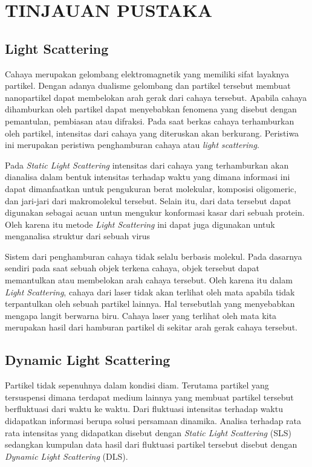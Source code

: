 \chapter{TINJAUAN PUSTAKA}

\section{Light Scattering}
Cahaya merupakan gelombang elektromagnetik yang memiliki sifat layaknya partikel. Dengan adanya
dualisme gelombang dan partikel tersebut membuat nanopartikel dapat membelokan arah gerak dari
cahaya tersebut. Apabila cahaya dihamburkan oleh partikel dapat menyebabkan fenomena yang disebut
dengan pemantulan, pembiasan atau difraksi. Pada saat berkas cahaya terhamburkan oleh partikel,
intensitas dari cahaya yang diteruskan akan berkurang. Peristiwa ini merupakan peristiwa penghamburan
cahaya atau \textit{light scattering}\cite{Black1996}.

Pada \textit{Static Light Scattering} intensitas dari cahaya yang terhamburkan  akan dianalisa dalam
bentuk intensitas terhadap waktu yang dimana informasi ini dapat dimanfaatkan untuk pengukuran berat
molekular, komposisi oligomeric, dan jari-jari dari makromolekul tersebut. Selain itu, dari data
tersebut dapat digunakan sebagai acuan untun mengukur konformasi kasar dari sebuah protein. Oleh
karena itu metode \textit{Light Scattering} ini dapat juga digunakan untuk menganalisa struktur dari
sebuah virus\cite{Stetefeld2016}

Sistem dari penghamburan cahaya tidak selalu berbasis molekul. Pada dasarnya sendiri pada saat
sebuah objek terkena cahaya, objek tersebut dapat memantulkan atau membelokan arah cahaya tersebut.
Oleh karena itu dalam \textit{Light Scattering}, cahaya dari laser tidak akan terlihat oleh mata
apabila tidak terpantulkan oleh sebuah partikel lainnya. Hal tersebutlah yang menyebabkan mengapa
langit berwarna biru. Cahaya laser yang terlihat oleh mata kita merupakan hasil dari hamburan
partikel di sekitar arah gerak cahaya tersebut.

\section{Dynamic Light Scattering}
Partikel tidak sepenuhnya dalam kondisi diam. Terutama partikel yang tersuspensi dimana terdapat
medium lainnya yang membuat partikel tersebut berfluktuasi dari waktu ke waktu. Dari fluktuasi
intensitas terhadap waktu didapatkan informasi berupa solusi persamaan dinamika. Analisa terhadap
rata rata intensitas yang didapatkan disebut dengan \textit{Static Light Scattering} (SLS) sedangkan
kumpulan data hasil dari fluktuasi partikel tersebut disebut dengan \textit{Dynamic Light Scattering}
(DLS).

